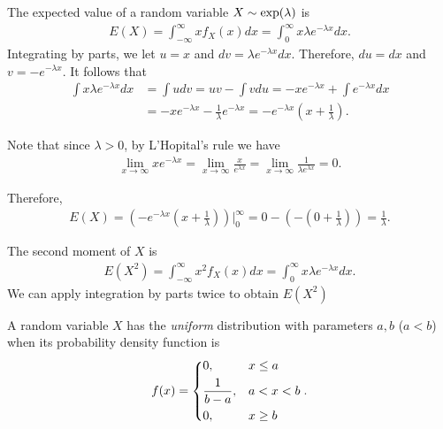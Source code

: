 \begin{exmp}
    The expected value of a random variable $X \sim \mathrm{exp}(\lambda)$ is
    \begin{align*}
        E(X) = \int_{-\infty}^{\infty}xf_X(x)dx = \int_{0}^{\infty}x\lambda e^{-\lambda x}dx.
    \end{align*}
    Integrating by parts, we let $u = x$ and $dv = \lambda e^{-\lambda x}dx$. Therefore, $du = dx$ and $v = -e^{-\lambda x}$. It follows that
    \begin{align*}
        \int x\lambda e^{-\lambda x}dx &= \int udv = uv - \int vdu = -xe^{-\lambda x} + \int e^{-\lambda x}dx \\
        &= -xe^{-\lambda x} - \frac{1}{\lambda}e^{-\lambda x} = -e^{-\lambda x}\left(x + \frac{1}{\lambda}\right).
    \end{align*}

    Note that since $\lambda > 0$, by L'Hopital's rule we have
    \begin{align*}
        \lim_{x \to \infty}xe^{-\lambda x} = \lim_{x \to \infty}\frac{x}{e^{\lambda x}} = \lim_{x \to \infty}\frac{1}{\lambda e^{\lambda x}} = 0.
    \end{align*}

    Therefore,
    \begin{align*}
        E(X) = \left(-e^{-\lambda x}\left(x + \frac{1}{\lambda}\right)\right)\big\rvert_{0}^{\infty} = 0 - \left(-\left(0 + \frac{1}{\lambda}\right)\right) = \frac{1}{\lambda}.
    \end{align*}

    The second moment of $X$ is
    \begin{align*}
        E(X^2) = \int_{-\infty}^{\infty}x^2f_X(x)dx = \int_{0}^{\infty}x\lambda e^{-\lambda x}dx.
    \end{align*}
    We can apply integration by parts twice to obtain $E(X^2)$
\end{exmp}

\begin{defn}
    A random variable $X$ has the \emph{uniform} distribution with parameters $a, b$ ($a < b$) when its probability density function is
    \begin{align}
        f(x) = \begin{dcases}
            0, & x \leq a \\
            \frac{1}{b - a}, & a < x < b \\
            0, & x \geq b
        \end{dcases}.
    \end{align}
\end{defn}


